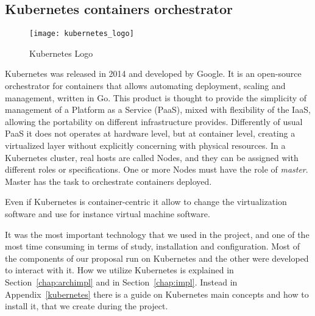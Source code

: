 \subsection{Kubernetes containers orchestrator}
\begin{figure}[H]
  \centering \texttt{[image: kubernetes\_logo]}
  \caption{Kubernetes Logo}
  \label{chap:intro:img:k8s_logo}
\end{figure}
Kubernetes was released in 2014 and developed by Google. It is an open-source
orchestrator for containers that allows automating deployment, scaling and
management, written in Go. This product is thought to provide the simplicity of
management of a Platform as a Service (PaaS), mixed with flexibility of the
IaaS, allowing the portability on different infrastructure provides. Differently
of usual PaaS it does not operates at hardware level, but at container level,
creating a virtualized layer without explicitly concerning with physical
resources. In a Kubernetes cluster, real hosts are called Nodes, and they can be
assigned with different roles or specifications. One or more Nodes must have the
role of \emph{master}. Master has the task to orchestrate containers deployed. 

Even if Kubernetes is container-centric it allow to change the virtualization
software and use for instance virtual machine software.

It was the most important technology that we used in the project, and one of the
most time consuming in terms of study, installation and configuration. Most of
the components of our proposal run on Kubernetes and the other were developed to
interact with it. How we utilize Kubernetes is explained in
Section~\ref{chap:archimpl} and in Section~\ref{chap:impl}. Instead in
Appendix~\ref{kubernetes} there is a guide on Kubernetes main concepts and how
to install it, that we create during the project.

